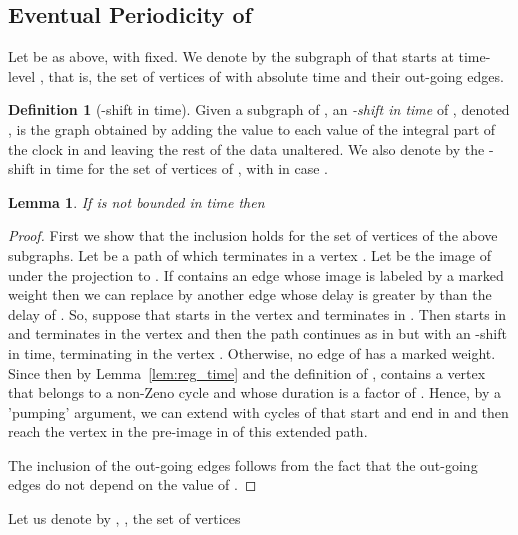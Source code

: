 \documentclass[11pt]{amsart}
\newtheorem{lemma}[theorem]{Lemma}
\theoremstyle{definition}
\newtheorem{definition}[theorem]{Definition}
\begin{document}
\subsection{Eventual Periodicity of }
Let  be as above, with  fixed.
We denote by  the subgraph of  that starts at time-level , that is, the set of vertices of  with absolute time  and their out-going edges.
\begin{definition}[-shift in time]
	Given a subgraph  of , an \emph{-shift in time} of , denoted , is the graph obtained by adding the value  to each value of the integral part of the clock  in  and leaving the rest of the data unaltered.
	We also denote by  the -shift in time for the set of vertices of , with  in case .
\end{definition}
\begin{lemma}
	\label{lem:forward_period}
	If  is not bounded in time then 
	
\end{lemma}
\begin{proof}
	First we show that the inclusion holds for the set of vertices of the above subgraphs.
	Let  be a path of  which terminates in a vertex .
	Let  be the image of  under the projection to .
	If  contains an edge  whose image  is labeled by a marked weight  then we can replace  by another edge  whose delay is greater by  than the delay of .
	So, suppose that  starts in the vertex  and terminates in . Then  starts in  and terminates in the vertex  and then the path continues as in  but with an -shift in time, terminating in the vertex .
Otherwise, no edge of  has a marked weight.
	Since  then by Lemma~\ref{lem:reg_time} and the definition of ,  contains a vertex  that belongs to a non-Zeno cycle  and whose duration is a factor of .
	Hence, by a 'pumping' argument, we can extend  with  cycles of  that start and end in  and then reach the vertex  in the pre-image in  of this extended path.
	
	The inclusion of the out-going edges follows from the fact that the out-going edges do not depend on the value of .
\end{proof}
Let us denote by , , the set of vertices
\end{document}

